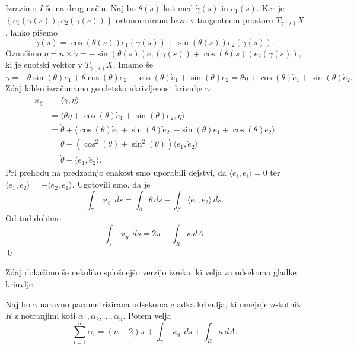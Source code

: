 Izrazimo $I$ še na drug način. Naj bo $\theta(s)$ kot med $\dot{\gamma}(s)$ in $e_1(s)$. Ker je $\left\{ e_1(\gamma(s)), e_2(\gamma(s))\right\}$ ortonormirana baza v tangentnem prostoru
$T_{\gamma(s)}X$, lahko pišemo \begin{equation*}
\dot{\gamma}(s) = \cos(\theta(s))e_1(\gamma(s)) + \sin(\theta(s))e_2(\gamma(s)).
\end{equation*}  
Označimo $\eta = n \times \dot{\gamma} = - \sin(\theta(s)) e_1(\gamma(s)) + \cos(\theta(s)) e_2(\gamma(s))$, ki je enotski vektor v  $T_{\gamma(s)}X$.
Imamo še \begin{equation*}
\ddot{\gamma} = -\dot{\theta} \sin(\theta) e_1 + \dot{\theta} \cos(\theta) e_2 +  \cos(\theta)\dot{e}_1 + \sin(\theta)\dot{e}_2 = \dot{\theta} \eta + \cos(\theta) \dot{e}_1 + \sin(\theta) \dot{e}_2.  
\end{equation*}  
Zdaj lahko izračunamo geodetsko ukrivljenost krivulje $\gamma$: \begin{align*}
    \varkappa_g &= \langle \ddot{\gamma}, \eta \rangle  \\
     &= \langle \dot{\theta} \eta + \cos(\theta) \dot{e}_1 + \sin(\theta) \dot{e}_2, \eta  \rangle \\
     &= \dot{\theta} + \langle \cos(\theta) \dot{e}_1 + \sin(\theta)\dot{e}_2, - \sin(\theta) e_1 + \cos(\theta) e_2 \rangle \\
     &= \dot{\theta} - (\cos^2(\theta) + \sin^2(\theta) ) \langle e_1, \dot{e}_2  \rangle \\
     &= \dot{\theta} - \langle e_1, \dot{e}_2  \rangle.  
\end{align*}
Pri prehodu na predzadnjo enakost smo uporabili dejstvi, da $\langle e_i, \dot{e}_i \rangle = 0$ ter $\langle e_1, \dot{e}_2 \rangle = - \langle e_2, \dot{e}_1 \rangle$.
Ugotovili smo, da je \begin{equation*}
\int_{\gamma} \varkappa_g  \, ds = \int_{\beta} \dot{\theta}  \, ds - \int_{\beta} \langle e_1, \dot{e}_2 \rangle   \, ds.  
\end{equation*}  
Od tod dobimo \begin{equation*}
    \int_{\gamma} \varkappa_g  \, ds  = 2 \pi  - \int_{R}  \kappa \, dA.  
\end{equation*}  
\qed
  
Zdaj dokažimo še nekoliko splošnejšo verzijo izreka, ki velja za odsekoma gladke kriuvlje.

\begin{izrek}
\label{izr_odsekoma_gladke_krivulje_GB}
Naj bo $\gamma$ naravno parametrizirana odsekoma gladka krivulja, ki omejuje $n$-kotnik $R$ z notranjimi koti $\alpha_1, \alpha_2, \ldots, \alpha_n$. Potem velja \begin{equation*}
\sum_{i=1}^{n} \alpha_i = (n-2) \pi + \int_{\gamma} \varkappa_g  \, ds + \int_{R} \kappa \, dA.  
\end{equation*}  
\end{izrek}


